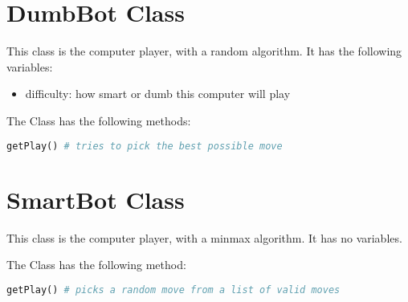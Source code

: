 \documentclass[12pt]{article}
\begin{document}
\section{DumbBot Class}

This class is the computer player, with a random algorithm. It has the following variables:
\begin{itemize}
  \item difficulty: how smart or dumb this computer will play
\end{itemize}

The Class has the following methods:
\begin{lstlisting}[language=Python]
getPlay() # tries to pick the best possible move
\end{lstlisting}


\section{SmartBot Class}

This class is the computer player, with a minmax algorithm. It has no variables.

The Class has the following method:
\begin{lstlisting}[language=Python]
getPlay() # picks a random move from a list of valid moves
\end{lstlisting}
\end{document}
